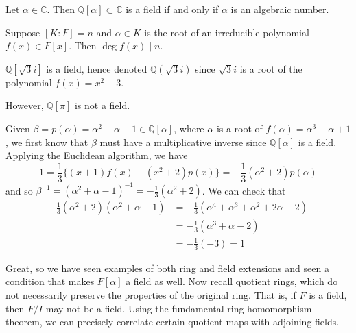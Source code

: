   \begin{corollary}
    Let $\alpha \in \mathbb{C}$. Then $\mathbb{Q}[\alpha] \subset \mathbb{C}$ is a field if and only if $\alpha$ is an algebraic number. 
  \end{corollary} 

  \begin{corollary} 
    Suppose $[K:F] = n$ and $\alpha \in K$ is the root of an irreducible polynomial $f(x) \in F[x]$. Then $\deg{f(x)} \mid n$. 
  \end{corollary}

  \begin{example}
    $\mathbb{Q}[\sqrt{3} i]$ is a field, hence denoted $\mathbb{Q}(\sqrt{3} i)$ since $\sqrt{3}i$ is a root of the polynomial $f(x) = x^2 + 3$. 
  \end{example}

  \begin{example}
    However, $\mathbb{Q}[\pi]$ is not a field. 
  \end{example} 

  \begin{example}
    Given $\beta = p(\alpha) = \alpha^2 + \alpha - 1 \in \mathbb{Q}[\alpha]$, where $\alpha$ is a root of $f(\alpha) = \alpha^3 + \alpha + 1$, we first know that $\beta$ must have a multiplicative inverse since $\mathbb{Q}[\alpha]$ is a field. Applying the Euclidean algorithm, we have 
    \begin{equation}
      1 = \frac{1}{3} \big\{ (x+1) f(x) - (x^2 + 2) p(x)\big\} = -\frac{1}{3} (\alpha^2 + 2) p(\alpha)
    \end{equation}
    and so $\beta^{-1} = (\alpha^2 + \alpha - 1)^{-1} = -\frac{1}{3} (\alpha^2 + 2)$. We can check that 
    \begin{align}
      -\frac{1}{3} (\alpha^2 + 2) (\alpha^2 + \alpha - 1) & = -\frac{1}{3} (\alpha^4 + \alpha^3 + \alpha^2 + 2 \alpha - 2) \\
                                                          & = -\frac{1}{3} (\alpha^3 + \alpha - 2) \\
                                                          & = -\frac{1}{3} (-3) = 1
    \end{align}
  \end{example}

  Great, so we have seen examples of both ring and field extensions and seen a condition that makes $F[\alpha]$ a field as well. Now recall quotient rings, which do not necessarily preserve the properties of the original ring. That is, if $F$ is a field, then $F/I$ may not be a field. Using the fundamental ring homomorphism theorem, we can precisely correlate certain quotient maps with adjoining fields. 

